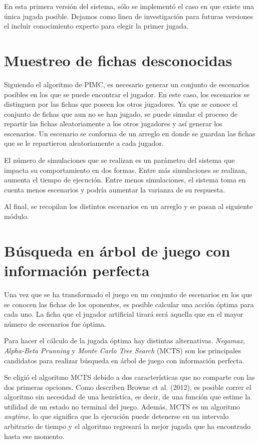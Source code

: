 En esta primera versión del sistema, sólo se implementó el caso en que existe
una única jugada posible. Dejamos como linea de investigación para futuras
versiones el incluir conocimiento experto para elegir la primer jugada.

\section{Muestreo de fichas desconocidas}

Siguiendo el algoritmo de PIMC, es necesario generar un conjunto de escenarios
posibles en los que se puede encontrar el jugador. En este caso, los escenarios
se distinguen por las fichas que poseen los otros jugadores. Ya que se conoce el
conjunto de fichas que aun no se han jugado, se puede simular el proceso de
repartir las fichas aleatoriamente a los otros jugadores y así generar los
escenarios. Un escenario se conforma de un arreglo en donde se guardan las
fichas que se le repartieron aleatoriamente a cada jugador.

El número de simulaciones que se realizan es un parámetro del sistema que
impacta su comportamiento en dos formas. Entre más simulaciones se realizan,
aumenta el tiempo de ejecución. Entre menos simulaciones, el sistema toma en
cuenta menos escenarios y podría aumentar la varianza de su respuesta.

Al final, se recopilan los distintos escenarios en un arreglo y se pasan al
siguiente módulo.

\section{Búsqueda en árbol de juego con información perfecta}

Una vez que se ha transformado el juego en un conjunto de escenarios en los que
se conocen las fichas de los oponentes, es posible calcular una acción óptima
para cada uno. La ficha que el jugador artificial tirará será aquella que en el
mayor número de escenarios fue óptima.

Para hacer el cálculo de la jugada óptima hay distintas alternativas.
\textit{Negamax}, \textit{Alpha-Beta Prunning} y \textit{Monte Carlo Tree
   Search} (MCTS) son los principales candidatos para realizar búsqueda en árbol de
juego con información perfecta.

Se eligió el algoritmo MCTS debido a dos características que no comparte con las
dos primeras opciones. Como describen Browne et al. (2012), es posible correr el
algoritmo sin necesidad de una heurística, es decir, de una función que estime
la utilidad de un estado no terminal del juego. Además, MCTS es un algoritmo
\textit{anytime}, lo que significa que la ejecución puede detenerse en un
intervalo arbitrario de tiempo y el algoritmo regresará la mejor jugada que ha
encontrado hasta ese momento.


